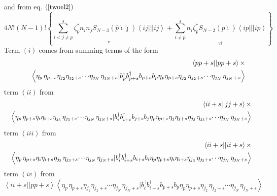 \documentclass{article}
\begin{document}
and from eq. $\left( \ref{twoel2}\right) $%
\begin{equation}
4N!\left( N-1\right) !\left\{ \underset{v}{\sum_{i<j\neq p}^{s}\zeta
_{p}^{\ast }n_{i}n_{j}S_{N-3}\left( \hat{p}\hat{\imath}\hat{\jmath}\right)
\left\langle ij|||ij\right\rangle }+\underset{vi}{\sum_{i\neq
p}^{s}n_{i}\zeta _{p}^{\ast }S_{N-2}\left( \hat{p}\hat{\imath}\right)
\left\langle ip|||ip\right\rangle }\right\}
\end{equation}%
Term $\left( i\right) $ comes from summing terms of the form%
\begin{eqnarray}
&&\left\langle pp+s||pp+s\right\rangle \times  \notag \\
&&\qquad \left\langle \eta _{p\,}\eta _{p+s}\eta _{j_{2}}\eta _{j_{2}+s}%
{\small \cdots }\eta _{j_{N}\,}\eta _{j_{N}+s}|b_{p}^{\dagger
}b_{p+s}^{\dagger }b_{p+s}b_{p}\eta _{p}\eta _{p+s}\eta _{j_{2}\,}\eta
_{j_{2}+s}{\small \cdots }\eta _{j_{N}\,}\eta _{j_{N}\,+s}\right\rangle
\label{t1}
\end{eqnarray}%
term $\left( ii\right) $ from%
\begin{eqnarray}
&&\left\langle ii+s||jj+s\right\rangle \times  \notag \\
&&\left\langle \eta _{p\,}\eta _{p+s}\eta _{i}\eta _{i+s}\eta _{j_{3}\,}\eta
_{j_{3}+s}{\small \cdots }\eta _{j_{N}\,}\eta _{j_{N}+s}|b_{i}^{\dagger
}b_{i+s}^{\dagger }b_{j+s}b_{j}\eta _{p}\eta _{p+s}\eta _{j}\eta _{j+s}\eta
_{j_{3}\,}\eta _{j_{3}+s}{\small \cdots }\eta _{j_{N}\,}\eta
_{j_{N}+s}\right\rangle  \label{t2}
\end{eqnarray}%
term $\left( iii\right) $ from%
\begin{eqnarray}
&&\left\langle ii+s||ii+s\right\rangle \times  \notag \\
&&\left\langle \eta _{p\,}\eta _{p+s}\eta _{i}\eta _{i+s}\eta _{j_{3}\,}\eta
_{j_{3}+s}{\small \cdots }\eta _{j_{N}\,}\eta _{j_{N}+s}|b_{i}^{\dagger
}b_{i+s}^{\dagger }b_{i+s}b_{i}\eta _{p}\eta _{p+s}\eta _{i}\eta _{i+s}\eta
_{j_{3}\,}\eta _{j_{3}+s}{\small \cdots }\eta _{j_{N}\,}\eta
_{j_{N}+s}\right\rangle  \label{t3}
\end{eqnarray}%
term $\left( iv\right) $ from%
\begin{equation}
\left\langle ii+s||pp+s\right\rangle \left\langle \eta _{p\,}\eta _{p+s}\eta
_{j_{2}}\eta _{j_{2}+s}\cdots \eta _{j_{N}\,}\eta _{j_{N}+s}|b_{i}^{\dagger
}b_{i+s}^{\dagger }b_{p+s}b_{p}\eta _{p}\eta _{p+s}\eta _{j_{2}\,}\eta
_{j_{2}+s}\cdots \eta _{j_{N}\,}\eta _{j_{N}+s}\right\rangle  \label{t4}
\end{equation}%
\end{document}
